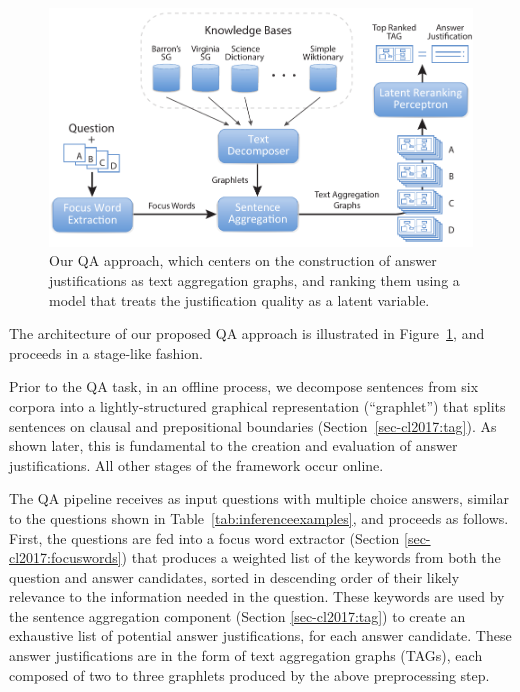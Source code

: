 \begin{figure}[t!]
\centering

\includegraphics[width=1.0\textwidth]{mainmatter/tacl2015-tig/tag_architecture6c.pdf}

\caption{Our QA approach, which centers on the construction of answer justifications as text aggregation graphs, and ranking them using a model that treats the justification quality as a latent variable.}
\label{fig:architecture}
\end{figure}

The architecture of our proposed QA approach is illustrated in Figure~\ref{fig:architecture}, and proceeds in a stage-like fashion.  

Prior to the QA task, in an offline process, we decompose sentences from six corpora into a lightly-structured graphical representation (``graphlet'') that splits sentences on clausal and prepositional boundaries (Section~\ref{sec-cl2017:tag}). As shown later, this is fundamental to the creation and evaluation of answer justifications.  All other stages of the framework occur online. 

The QA pipeline receives as input questions with multiple choice answers, similar to the questions shown in Table~\ref{tab:inferenceexamples}, and proceeds as follows. First, the questions are fed into a focus word extractor (Section \ref{sec-cl2017:focuswords}) that produces a weighted list of the keywords from both the question and answer candidates, sorted in descending order of their likely relevance to the information needed in the question. These keywords are used by the sentence aggregation component (Section \ref{sec-cl2017:tag}) to create an exhaustive list of potential answer justifications, for each answer candidate.  These answer justifications are in the form of text aggregation graphs (TAGs), each composed of two to three graphlets produced by the above preprocessing step.

